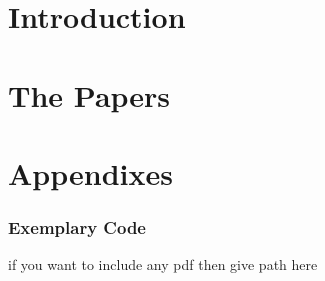 \documentclass[openright,12pt]{Latex/Classes/PhDthesisPSnPDF}
\begin{document}
\mainmatter

\renewcommand{\chaptername}{} %




\part{Introduction}
\label{part:part1}



	 
 
 
\part{The Papers}
\label{part:part2}











\part{Appendixes}
\label{part:part3}
%
\section*{Exemplary Code}
\label{appendix:code}


\newpage

{}
if you want to include any pdf then give path here
%
\label{poster_tech}
\end{document}
